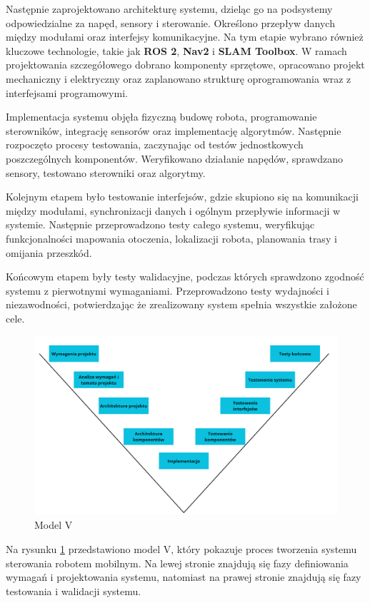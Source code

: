 \documentclass[a4paper,twoside,12pt]{book}
\begin{document}
Następnie zaprojektowano architekturę systemu, dzieląc go na podsystemy odpowiedzialne za napęd, sensory i sterowanie.
 Określono przepływ danych między modułami oraz interfejsy komunikacyjne. Na tym etapie wybrano również kluczowe technologie, takie jak \textbf{ROS 2}, \textbf{Nav2} i \textbf{SLAM Toolbox}.
  W ramach projektowania szczegółowego dobrano komponenty sprzętowe, opracowano projekt mechaniczny i elektryczny oraz zaplanowano strukturę oprogramowania wraz z interfejsami programowymi.

Implementacja systemu objęła fizyczną budowę robota, programowanie sterowników, integrację sensorów oraz implementację algorytmów.
\newpage
 Następnie rozpoczęto procesy testowania, zaczynając od testów jednostkowych poszczególnych komponentów. Weryfikowano działanie napędów, sprawdzano sensory, testowano sterowniki oraz algorytmy.

Kolejnym etapem było testowanie interfejsów, gdzie skupiono się na komunikacji między modułami, synchronizacji danych i ogólnym przepływie informacji w systemie.
 Następnie przeprowadzono testy całego systemu, weryfikując funkcjonalności mapowania otoczenia, lokalizacji robota, planowania trasy i omijania przeszkód.

Końcowym etapem były testy walidacyjne, podczas których sprawdzono zgodność systemu z pierwotnymi wymaganiami. Przeprowadzono testy wydajności i niezawodności, potwierdzając że zrealizowany system spełnia wszystkie założone cele. 

\begin{figure}[!hb]
	\centering
	\includegraphics[width=1\textwidth]{images/modelV.png}
	\caption{Model V}
	\label{fig:modelv}
\end{figure}
Na rysunku \ref{fig:modelv} przedstawiono model V, który pokazuje proces tworzenia systemu sterowania robotem mobilnym. Na lewej stronie znajdują się fazy definiowania wymagań i projektowania systemu, natomiast na prawej stronie znajdują się fazy testowania i walidacji systemu.
\newpage
\end{document}

